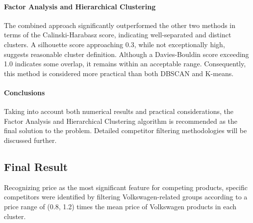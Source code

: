 \documentclass{article}
\begin{document}
\paragraph{Factor Analysis and Hierarchical Clustering}
The combined approach significantly outperformed the other two methods in terms of the Calinski-Harabasz score, indicating well-separated and distinct clusters.
A silhouette score approaching 0.3, while not exceptionally high, suggests reasonable cluster definition.
Although a Davies-Bouldin score exceeding 1.0 indicates some overlap, it remains within an acceptable range.
Consequently, this method is considered more practical than both DBSCAN and K-means.

\paragraph{Conclusions}
Taking into account both numerical results and practical considerations, the Factor Analysis and Hierarchical Clustering algorithm is recommended as the final solution to the problem.
Detailed competitor filtering methodologies will be discussed further.

\subsection{Final Result}
Recognizing price as the most significant feature for competing products, specific competitors were identified by filtering Volkswagen-related groups according to a price range of (0.8, 1.2) times the mean price of Volkswagen products in each cluster.
\end{document}
